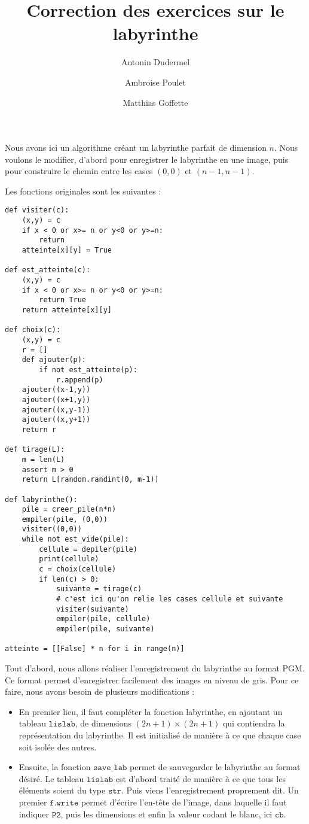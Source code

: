 \documentclass[11pt,a4paper]{article}
\title{Correction des exercices sur le labyrinthe}
\date{}
\author{Antonin Dudermel \and Ambroise Poulet \and Matthias Goffette}
\begin{document}

\maketitle

\begin{it}
Nous avons ici un algorithme créant un labyrinthe parfait de dimension $n$. Nous voulons le modifier, d'abord pour enregistrer le labyrinthe en une image, puis pour construire le chemin entre les cases $(0,0)$ et $(n-1,n-1)$.
\end{it}
\par
Les fonctions originales sont les suivantes :

\begin{lstlisting}
def visiter(c):
    (x,y) = c
    if x < 0 or x>= n or y<0 or y>=n:
        return
    atteinte[x][y] = True

def est_atteinte(c):
    (x,y) = c
    if x < 0 or x>= n or y<0 or y>=n:
        return True
    return atteinte[x][y]

def choix(c):
    (x,y) = c
    r = []
    def ajouter(p):
        if not est_atteinte(p):
            r.append(p)
    ajouter((x-1,y))
    ajouter((x+1,y))
    ajouter((x,y-1))
    ajouter((x,y+1))
    return r

def tirage(L):
    m = len(L)
    assert m > 0
    return L[random.randint(0, m-1)]

def labyrinthe():
    pile = creer_pile(n*n)
    empiler(pile, (0,0))
    visiter((0,0))
    while not est_vide(pile):
        cellule = depiler(pile)
        print(cellule)
        c = choix(cellule)
        if len(c) > 0:
            suivante = tirage(c)
            # c'est ici qu'on relie les cases cellule et suivante
            visiter(suivante)
            empiler(pile, cellule)
            empiler(pile, suivante)
            
atteinte = [[False] * n for i in range(n)]
\end{lstlisting}
\par
Tout d'abord, nous allons réaliser l'enregistrement du labyrinthe au format PGM. Ce format permet d'enregistrer facilement des images en niveau de gris. Pour ce faire, nous avons besoin de plusieurs modifications :
\begin{itemize}
	\item En premier lieu, il faut compléter la fonction labyrinthe, en ajoutant un tableau $\mathtt{lislab}$, de dimensions $(2n+1) \times (2n+1)$ qui contiendra la représentation du labyrinthe. Il est initialisé de manière à ce que chaque case soit isolée des autres.
	\item Ensuite, la fonction $\mathtt{save\_lab}$ permet de sauvegarder le labyrinthe au format désiré. Le tableau $\mathtt{lislab}$ est d'abord traité de manière à ce que tous les éléments soient du type $\mathtt{str}$. Puis viens l'enregistrement proprement dit. Un premier $\mathtt{f.write}$ permet d'écrire l'en-tête de l'image, dans laquelle il faut indiquer $\mathtt{P2}$, puis les dimensions et enfin la valeur codant le blanc, ici $\mathtt{cb}$.
\end{itemize}
\end{document}
